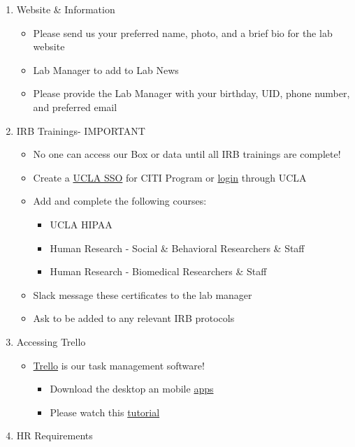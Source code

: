 \documentclass[
]{book}
\providecommand{\tightlist}{%
  \setlength{\itemsep}{0pt}\setlength{\parskip}{0pt}}
\begin{document}
\begin{enumerate}
\def\labelenumi{\arabic{enumi}.}
\tightlist
\item
  Website \& Information

  \begin{itemize}
  \tightlist
  \item
    Please send us your preferred name, photo, and a brief bio for the lab website
  \item
    Lab Manager to add to Lab News
  \item
    Please provide the Lab Manager with your birthday, UID, phone number, and preferred email
  \end{itemize}
\item
  IRB Trainings- IMPORTANT

  \begin{itemize}
  \tightlist
  \item
    No one can access our Box or data until all IRB trainings are complete!
  \item
    Create a \href{https://ora.research.ucla.edu/OHRPP/Documents/Education/SSO_CITI_New_Acct.pdf}{UCLA SSO} for CITI Program or \href{https://www.research.ucla.edu/CITIProgram/}{login} through UCLA
  \item
    Add and complete the following courses:

    \begin{itemize}
    \tightlist
    \item
      UCLA HIPAA
    \item
      Human Research - Social \& Behavioral Researchers \& Staff
    \item
      Human Research - Biomedical Researchers \& Staff
    \end{itemize}
  \item
    Slack message these certificates to the lab manager
  \item
    Ask to be added to any relevant IRB protocols
  \end{itemize}
\item
  Accessing Trello

  \begin{itemize}
  \tightlist
  \item
    \href{https://trello.com}{Trello} is our task management software!

    \begin{itemize}
    \tightlist
    \item
      Download the desktop an mobile \href{https://trello.com/en-US/platforms}{apps}
    \item
      Please watch this \href{https://youtu.be/_Ry-SnJygy8}{tutorial}
    \end{itemize}
  \end{itemize}
\item
  HR Requirements


\end{enumerate}
\end{document}
